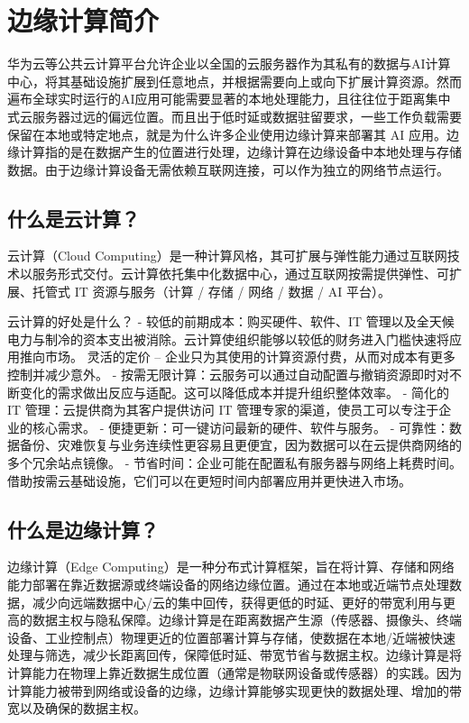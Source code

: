 \section{边缘计算简介}\label{src-book-chapter1-h1}

华为云等公共云计算平台允许企业以全国的云服务器作为其私有的数据与AI计算中心，将其基础设施扩展到任意地点，并根据需要向上或向下扩展计算资源。然而遍布全球实时运行的AI应用可能需要显著的本地处理能力，且往往位于距离集中式云服务器过远的偏远位置。而且出于低时延或数据驻留要求，一些工作负载需要保留在本地或特定地点，就是为什么许多企业使用边缘计算来部署其
AI
应用。边缘计算指的是在数据产生的位置进行处理，边缘计算在边缘设备中本地处理与存储数据。由于边缘计算设备无需依赖互联网连接，可以作为独立的网络节点运行。

\subsection{什么是云计算？}\label{src-book-chapter1-h2}

云计算（Cloud
Computing）是一种计算风格，其可扩展与弹性能力通过互联网技术以服务形式交付。云计算依托集中化数据中心，通过互联网按需提供弹性、可扩展、托管式
IT 资源与服务（计算 / 存储 / 网络 / 数据 / AI 平台）。

云计算的好处是什么？ - 较低的前期成本：购买硬件、软件、IT
管理以及全天候电力与制冷的资本支出被消除。云计算使组织能够以较低的财务进入门槛快速将应用推向市场。
灵活的定价 --
企业只为其使用的计算资源付费，从而对成本有更多控制并减少意外。 -
按需无限计算：云服务可以通过自动配置与撤销资源即时对不断变化的需求做出反应与适配。这可以降低成本并提升组织整体效率。
- 简化的 IT 管理：云提供商为其客户提供访问 IT
管理专家的渠道，使员工可以专注于企业的核心需求。 -
便捷更新：可一键访问最新的硬件、软件与服务。 -
可靠性：数据备份、灾难恢复与业务连续性更容易且更便宜，因为数据可以在云提供商网络的多个冗余站点镜像。
-
节省时间：企业可能在配置私有服务器与网络上耗费时间。借助按需云基础设施，它们可以在更短时间内部署应用并更快进入市场。

\subsection{什么是边缘计算？}\label{src-book-chapter1-h3}

边缘计算（Edge
Computing）是一种分布式计算框架，旨在将计算、存储和网络能力部署在靠近数据源或终端设备的网络边缘位置。通过在本地或近端节点处理数据，减少向远端数据中心/云的集中回传，获得更低的时延、更好的带宽利用与更高的数据主权与隐私保障。边缘计算是在距离数据产生源（传感器、摄像头、终端设备、工业控制点）物理更近的位置部署计算与存储，使数据在本地/近端被快速处理与筛选，减少长距离回传，保障低时延、带宽节省与数据主权。边缘计算是将计算能力在物理上靠近数据生成位置（通常是物联网设备或传感器）的实践。因为计算能力被带到网络或设备的边缘，边缘计算能够实现更快的数据处理、增加的带宽以及确保的数据主权。

